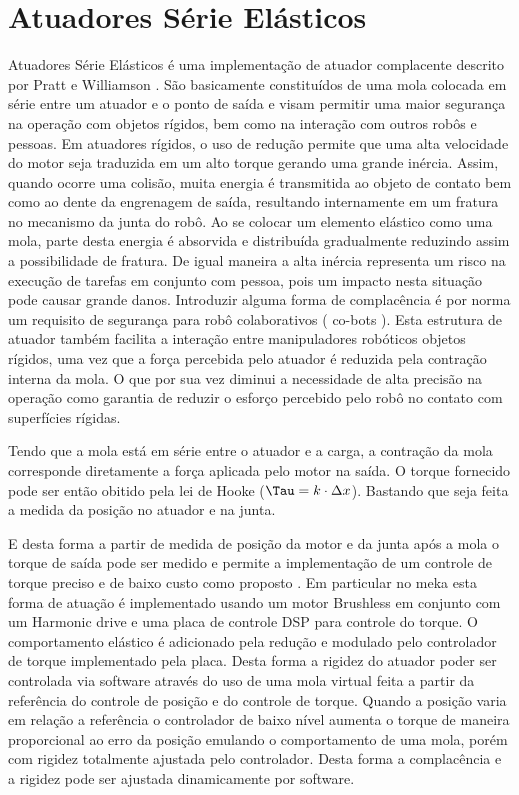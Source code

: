 \section{Atuadores Série Elásticos}

Atuadores Série Elásticos é uma implementação de atuador complacente descrito por Pratt e Williamson \cite{pratt1995series}. São basicamente constituídos de uma mola colocada em série entre um atuador e o ponto de saída e visam permitir uma maior segurança na operação com objetos rígidos, bem como na interação com outros robôs e pessoas. Em atuadores rígidos, o uso de redução permite que uma alta velocidade do motor seja traduzida em um alto torque gerando uma grande inércia. Assim, quando ocorre uma colisão, muita energia é transmitida ao objeto de contato bem como ao dente da engrenagem de saída, resultando internamente em um fratura no mecanismo da junta do robô. Ao se colocar um elemento elástico como uma mola, parte desta energia é absorvida e distribuída gradualmente reduzindo assim a possibilidade de fratura. De igual maneira a alta inércia representa um risco na execução de tarefas em conjunto com pessoa, pois um impacto nesta situação pode causar grande danos. Introduzir alguma forma de complacência é por norma \cite{nobody} um requisito de segurança para robô colaborativos ( co-bots ). Esta estrutura de atuador também facilita a interação entre manipuladores robóticos objetos rígidos, uma vez que a força percebida pelo atuador é reduzida pela contração interna da mola. O que por sua vez diminui a necessidade de alta precisão na operação como garantia de reduzir o esforço percebido pelo robô no contato com superfícies rígidas.

Tendo que a mola está em série entre o atuador e a carga, a contração da mola corresponde diretamente a força aplicada pelo motor na saída. O torque fornecido pode ser então obitido pela lei de Hooke ($\Tau = k\cdot \Delta x$). Bastando que seja feita a medida da posição no atuador e na junta.


E desta forma a partir de medida de posição da motor e da junta após a mola o torque de saída pode ser medido e permite a implementação de um controle de torque preciso e de baixo custo como proposto \cite{nobody}. Em particular no meka esta forma de atuação é implementado usando um motor Brushless em conjunto com um Harmonic drive e uma placa de controle DSP para controle do torque. O comportamento elástico é adicionado pela redução e modulado pelo controlador de torque implementado pela placa. Desta forma a rigidez do atuador poder ser controlada via software através do uso de uma mola virtual feita a partir da referência do controle de posição e do controle de torque. Quando a posição varia em relação a referência o controlador de baixo nível aumenta o torque de maneira proporcional ao erro da posição emulando o comportamento de uma mola, porém com rigidez totalmente ajustada pelo controlador. Desta forma a complacência e a rigidez pode ser ajustada dinamicamente por software. \cite{nobody}

